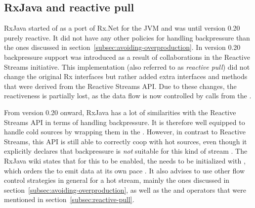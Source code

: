 \subsection{RxJava and reactive pull}
RxJava started of as a port of Rx.Net for the JVM and was until version 0.20 purely reactive. It did not have any other policies for handling backpressure than the ones discussed in section~\ref{subsec:avoiding-overproduction}. In version 0.20 backpressure support was introduced as a result of collaborations in the Reactive Streams initiative. This implementation (also referred to as \textit{reactive pull}) did not change the original Rx interfaces but rather added extra interfaces and methods that were derived from the Reactive Streams API. Due to these changes, the reactiveness is partially lost, as the data flow is now controlled by  calls from the \obv.

From version 0.20 onward, RxJava has a lot of similarities with the Reactive Streams API in terms of handling backpressure. It is therefore well equipped to handle cold sources by wrapping them in the \obs. However, in contrast to Reactive Streams, this API is still able to correctly coop with hot sources, even though it explicitly declares that backpressure is \emph{not} suitable for this kind of stream \cite{RxJava-Wiki-HotCold}. The RxJava wiki states that for this to be enabled, the \obs needs to be initialized with , which orders the \obs to emit data at its own pace \cite{RxJava-Wiki-Backpressure}. It also advises to use other flow control strategies in general for a hot stream, mainly the ones discussed in section~\ref{subsec:avoiding-overproduction}, as well as the  and  operators that were mentioned in section~\ref{subsec:reactive-pull}.

